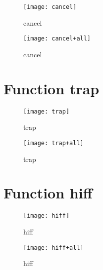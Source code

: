 \begin{figure}[h]
\begin{center}
\texttt{[image: cancel]}
\caption{cancel}
\end{center}
\end{figure}

\begin{figure}[h]
\begin{center}
\texttt{[image: cancel+all]}
\caption{cancel}
\end{center}
\end{figure}

\newpage

\section{Function trap}

\begin{center}

\end{center}

\begin{figure}[h]
\begin{center}
\texttt{[image: trap]}
\caption{trap}
\end{center}
\end{figure}

\begin{figure}[h]
\begin{center}
\texttt{[image: trap+all]}
\caption{trap}
\end{center}
\end{figure}

\newpage

\section{Function hiff}

\begin{center}

\end{center}

\begin{figure}[h]
\begin{center}
\texttt{[image: hiff]}
\caption{hiff}
\end{center}
\end{figure}

\begin{figure}[h]
\begin{center}
\texttt{[image: hiff+all]}
\caption{hiff}
\end{center}
\end{figure}

